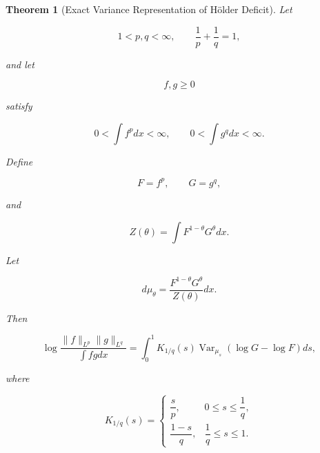 \documentclass[10pt,a4paper]{amsart}
\newtheorem{theorem}{Theorem}
\begin{document}
\begin{theorem}[Exact Variance Representation of Hölder Deficit]
Let

\[
1<p,q<\infty,
\qquad
\frac1p+\frac1q=1,
\]

and let

\[
f,g\geq0
\]

satisfy

\[
0<
\int f^p dx<\infty ,
\qquad
0<
\int g^q dx<\infty .
\]

Define

\[
F=f^p,
\qquad
G=g^q,
\]

and

\[
Z(\theta)
=
\int
F^{1-\theta}G^\theta dx .
\]

Let

\[
d\mu_\theta
=
\frac{
F^{1-\theta}G^\theta
}{
Z(\theta)
}
dx .
\]

Then

\[
\boxed{
\log
\frac{
\|f\|_{L^p}
\|g\|_{L^q}
}{
\int fg dx
}
=
\int_0^1
K_{1/q}(s)
\operatorname{Var}_{\mu_s}
\left(
\log G-\log F
\right)
ds ,
}
\]

where

\[
K_{1/q}(s)
=
\begin{cases}
\dfrac{s}{p},
&
0\leq s\leq\dfrac1q ,
\\[2ex]
\dfrac{1-s}{q},
&
\dfrac1q\leq s\leq1 .
\end{cases}
\]

\end{theorem}
\end{document}
